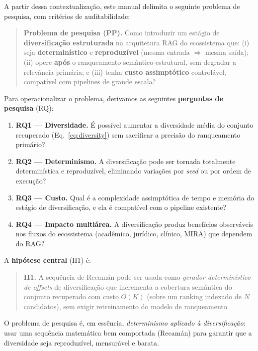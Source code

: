  A partir dessa contextualização, este manual delimita o seguinte
problema de pesquisa, com critérios de auditabilidade:

\begin{quote}
\textbf{Problema de pesquisa (PP).} Como introduzir um estágio de
\textbf{diversificação estruturada} na arquitetura RAG do ecossistema que: (i)
seja \textbf{determinístico} e \textbf{reproduzível} (mesma entrada $\Rightarrow$
mesma saída); (ii) opere \textbf{após} o ranqueamento semântico-estrutural, sem
degradar a relevância primária; e (iii) tenha \textbf{custo assimptótico}
controlável, compatível com pipelines de grande escala?
\end{quote}

Para operacionalizar o problema, derivamos as seguintes \textbf{perguntas de
pesquisa} (RQ):

\begin{enumerate}[label=\textbf{RQ\arabic*.}]
  \item \textbf{RQ1 --- Diversidade.} É possível aumentar a diversidade média do
        conjunto recuperado (Eq.~\ref{eq:diversity}) sem sacrificar a precisão do
        ranqueamento primário?
  \item \textbf{RQ2 --- Determinismo.} A diversificação pode ser tornada
        totalmente determinística e reproduzível, eliminando variações por \emph{seed}
        ou por ordem de execução?
  \item \textbf{RQ3 --- Custo.} Qual é a complexidade assimptótica de tempo e
        memória do estágio de diversificação, e ela é compatível com o pipeline
        existente?
  \item \textbf{RQ4 --- Impacto multiárea.} A diversificação produz benefícios
        observáveis nos fluxos do ecossistema (acadêmico, jurídico, clínico, MIRA)
        que dependem do RAG?
\end{enumerate}

\noindent A \textbf{hipótese central} (H1) é:

\begin{quote}
\textbf{H1.} A sequência de Recamán pode ser usada como \emph{gerador
determinístico de offsets} de diversificação que incrementa a cobertura semântica
do conjunto recuperado com custo $O(K)$ (sobre um ranking indexado de $N$
candidatos), sem exigir retreinamento do modelo de ranqueamento.
\end{quote}

\begin{pontochave}
O problema de pesquisa é, em essência, \emph{determinismo aplicado à
diversificação}: usar uma sequência matemática bem comportada (Recamán) para
garantir que a diversidade seja reproduzível, mensurável e barata.
\end{pontochave}

